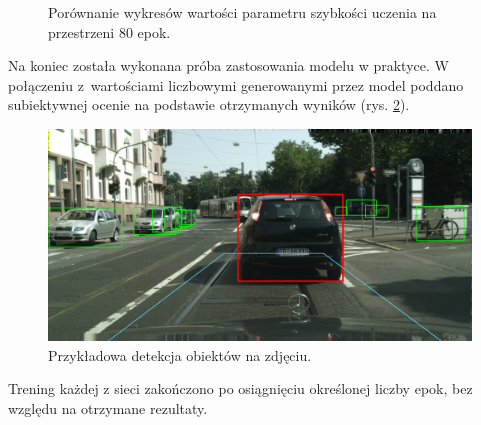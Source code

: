 \begin{figure}[H]
\centering
{}
\hspace{0.5cm}
\hfill
\caption{Porównanie wykresów wartości parametru szybkości uczenia na przestrzeni 80 epok.}
\label{fig:lr_auto}
\end{figure}

\hspace{0.5cm}
Na koniec została wykonana próba zastosowania modelu w praktyce. W połączeniu z~wartościami liczbowymi generowanymi przez model poddano subiektywnej ocenie na podstawie otrzymanych wyników (rys. \ref{fig:graf}). 

\begin{figure}[H]
    \centering
    \includegraphics[width=0.7\linewidth]{Obrazy/Rozdzial05/info/przyklad.png}
    \caption{Przykładowa detekcja obiektów na zdjęciu.}
    \label{fig:graf}
\end{figure}

\hspace{0.5cm}
Trening każdej z sieci zakończono po osiągnięciu określonej liczby epok, bez względu na otrzymane rezultaty.

